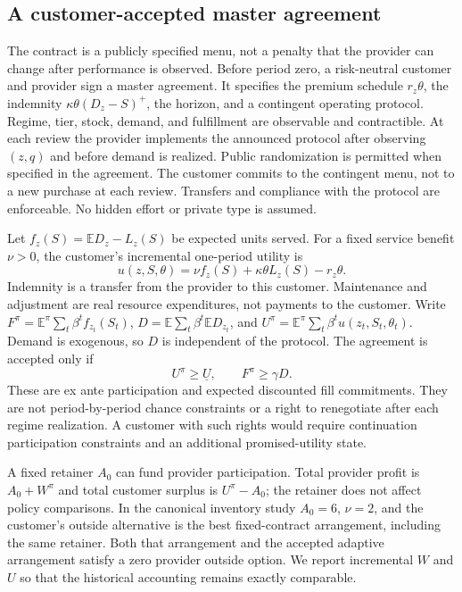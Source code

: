\documentclass[11pt,letterpaper]{article}
\theoremstyle{definition}
\newcommand{\E}{\mathbb E}
\newcommand{\1}{\mathbf 1}
\begin{document}
\subsection{A customer-accepted master agreement}\label{sec:institution}
The contract is a publicly specified menu, not a penalty that the provider can change after performance is observed. Before period zero, a risk-neutral customer and provider sign a master agreement. It specifies the premium schedule $r_z\theta$, the indemnity $\kappa\theta(D_z-S)^+$, the horizon, and a contingent operating protocol. Regime, tier, stock, demand, and fulfillment are observable and contractible. At each review the provider implements the announced protocol after observing $(z,q)$ and before demand is realized. Public randomization is permitted when specified in the agreement. The customer commits to the contingent menu, not to a new purchase at each review. Transfers and compliance with the protocol are enforceable. No hidden effort or private type is assumed.

Let $f_z(S)=\E D_z-L_z(S)$ be expected units served. For a fixed service benefit $\nu>0$, the customer's incremental one-period utility is
\begin{equation}\label{eq:customer}
 u(z,S,\theta)=\nu f_z(S)+\kappa\theta L_z(S)-r_z\theta.
\end{equation}
Indemnity is a transfer from the provider to this customer. Maintenance and adjustment are real resource expenditures, not payments to the customer. Write $F^\pi=\E^\pi\sum_t\beta^t f_{z_t}(S_t)$, $D=\E\sum_t\beta^t\E D_{z_t}$, and $U^\pi=\E^\pi\sum_t\beta^t u(z_t,S_t,\theta_t)$. Demand is exogenous, so $D$ is independent of the protocol. The agreement is accepted only if
\begin{equation}\label{eq:participation}
 U^\pi\geq\underline U,\qquad F^\pi\geq\gamma D.
\end{equation}
These are ex ante participation and expected discounted fill commitments. They are not period-by-period chance constraints or a right to renegotiate after each regime realization. A customer with such rights would require continuation participation constraints and an additional promised-utility state.

A fixed retainer $A_0$ can fund provider participation. Total provider profit is $A_0+W^\pi$ and total customer surplus is $U^\pi-A_0$; the retainer does not affect policy comparisons. In the canonical inventory study $A_0=6$, $\nu=2$, and the customer's outside alternative is the best fixed-contract arrangement, including the same retainer. Both that arrangement and the accepted adaptive arrangement satisfy a zero provider outside option. We report incremental $W$ and $U$ so that the historical accounting remains exactly comparable.
\end{document}
